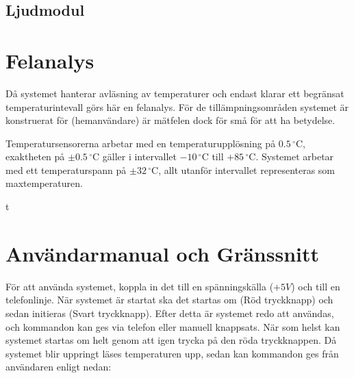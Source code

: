 \documentclass[a4paper,11pt]{article}
\begin{document}
		\subsection{Ljudmodul}

\section{Felanalys}

Då systemet hanterar avläsning av temperaturer och endast klarar ett begränsat temperaturintevall
görs här en felanalys. För de tillämpningsområden systemet är konstruerat för (hemanvändare) 
är mätfelen dock för små för att ha betydelse.

Temperatursensorerna arbetar med en temperaturupplösning på $0.5\,^{\circ}\mathrm{C}$, exaktheten på $\pm 0.5\,^{\circ}\mathrm{C}$ gäller i intervallet $-10\,^{\circ}\mathrm{C}$ till $+85\,^{\circ}\mathrm{C}$.
Systemet arbetar med ett temperaturspann på $\pm 32\,^{\circ}\mathrm{C}$, allt utanför intervallet representeras som maxtemperaturen.

\pagebreak

	\appendix
	\renewcommand{\appendixpagename}{Appendix}t
	\appendixpage
	\renewcommand{\appendixtocname}{Appendix}

	\addappheadtotoc

	\section{Användarmanual och Gränssnitt}
	\label{sec:Manual}
	För att använda systemet, koppla in det till en spänningskälla ($+5V$) och till en telefonlinje.
	När systemet är startat ska det startas om (Röd tryckknapp) och sedan initieras (Svart tryckknapp).
	Efter detta är systemet redo att användas, och kommandon kan ges via telefon eller manuell knappsats.
	När som helst kan systemet startas om helt genom att igen trycka på den röda tryckknappen.
	Då systemet blir uppringt läses temperaturen upp, sedan kan kommandon ges från användaren enligt nedan:\\
\end{document}
